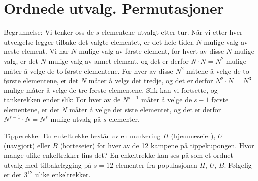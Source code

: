 \section{Ordnede utvalg. Permutasjoner}
\begin{center}  \end{center}
Begrunnelse: Vi tenker oss de $s$ elementene utvalgt etter tur.
Når vi etter hver utvelgelse legger tilbake det valgte
elementet, er det hele tiden $N$ mulige valg av neste element. Vi
har $N$ mulige valg av første element, for hvert av disse $N$
mulige valg, er det $N$ mulige valg av annet element, og det er
derfor $N\cdot N = N^2$ mulige måter å velge de to første
elementene. For hver av disse $N^2$ måtene å velge de to første
elementene, er det $N$ måter å velge det tredje, og det er derfor
$N^2\cdot N=N^3$ mulige måter å velge de tre første elementene.
Slik kan vi fortsette, og tankerekken ender slik: For hver av de
$N^{s-1}$ måter å velge de $s-1$ første elementene, er det $N$
måter å velge det siste elementet, og det er derfor $N^{s-1}
\cdot N = N^s$ mulige utvalg på $s$ elementer.\\


\begin{eksempel}{Tipperekker}
En enkeltrekke består av en markering $H$ (hjemmeseier), $U$
(uavgjort) eller $B$ (borteseier) for hver av de 12 kampene på
tippekupongen. Hvor mange ulike enkeltrekker fins det? En
enkeltrekke kan ses på som et ordnet utvalg med tilbakelegging på
$s = 12$ elementer fra populasjonen $H$, $U$, $B$. Følgelig er det
$3^{12}$ ulike enkeltrekker.
\end{eksempel}

